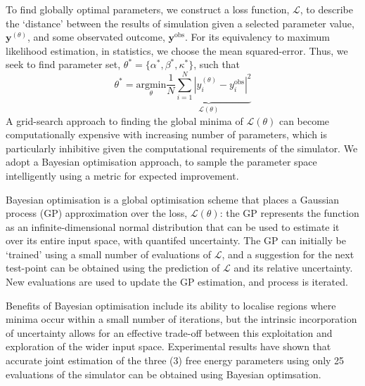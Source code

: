\documentclass[a4paper,11pt]{article}
\begin{document}
\noindent%
To find globally optimal parameters, we construct a loss function, $\mathcal{L}$, to describe the `distance' between the results of simulation given a selected parameter value, $\mathbf{y}^{(\theta)}$, and some observated outcome, $\mathbf{y}^\mathrm{obs}$. For its equivalency to maximum likelihood estimation, in statistics, we choose the mean squared-error. Thus, we seek to find parameter set, $\theta^\ast = \{\alpha^\ast,\beta^\ast,\kappa^\ast\}$, such that
\begin{equation*}
    \theta^\ast = \underset{\theta}{\mathrm{argmin}} \underbrace{\frac{1}{N}\sum^{N}_{i=1}|y_i^{(\theta)} - y_i^\mathrm{obs}|^2}_{\mathcal{L}(\theta)}
\end{equation*}
A grid-search approach to finding the global minima of $\mathcal{L}(\theta)$ can become computationally expensive with increasing number of parameters, which is particularly inhibitive given the computational requirements of the simulator. We adopt a Bayesian optimisation approach, to sample the parameter space intelligently using a metric for expected improvement.

Bayesian optimisation is a global optimisation scheme that places a Gaussian process (GP) approximation over the loss, $\mathcal{L}(\theta)$: the GP represents the function as an infinite-dimensional normal distribution that can be used to estimate it over its entire input space, with quantifed uncertainty. The GP can initially be `trained' using a small number of evaluations of $\mathcal{L}$, and a suggestion for the next test-point can be obtained using the prediction of $\mathcal{L}$ and its relative uncertainty. New evaluations are used to update the GP estimation, and process is iterated.

Benefits of Bayesian optimisation include its ability to localise regions where minima occur within a small number of iterations, but the intrinsic incorporation of uncertainty allows for an effective trade-off between this exploitation and exploration of the wider input space. Experimental results have shown that accurate joint estimation of the three (3) free energy parameters using only 25 evaluations of the simulator can be obtained using Bayesian optimsation.
\end{document}
